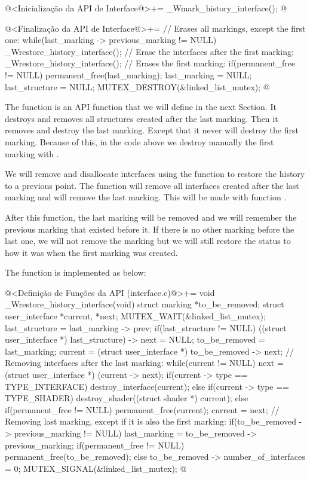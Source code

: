 \iniciocodigo
@<Inicialização da API de Interface@>+=
_Wmark_history_interface();
@
\fimcodigo

\iniciocodigo
@<Finalização da API de Interface@>+=
// Erases all markings, except the first one:
while(last_marking -> previous_marking != NULL){
  _Wrestore_history_interface();
}
// Erase the interfaces after the first marking:
_Wrestore_history_interface();
// Erases the first marking:
if(permanent_free != NULL)
  permanent_free(last_marking);
last_marking = NULL;
last_structure = NULL;
MUTEX_DESTROY(&linked_list_mutex);
@
\fimcodigo

The function  is an API
function that we will define in the next Section. It destroys and
removes all structures created after the last marking. Then it removes
and destroy the last marking. Except that it never will destroy the
first marking. Because of this, in the code above we destroy manually
the first marking with .


We will remove and disallocate interfaces using the function to
restore the history to a previous point. The function will remove all
interfaces created after the last marking and will remove the last
marking. This will be made with
function .

After this function, the last marking will be removed and we will
remember the previous marking that existed before it. If there is no
other marking before the last one, we will not remove the marking but
we will still restore the status to how it was when the first marking
was created.

The function is implemented as below:

\iniciocodigo
@<Definição de Funções da API (interface.c)@>+=
void _Wrestore_history_interface(void){
  struct marking *to_be_removed;
  struct user_interface *current, *next;
  MUTEX_WAIT(&linked_list_mutex);
  last_structure = last_marking -> prev;
  if(last_structure != NULL)
    ((struct user_interface *) last_structure) -> next = NULL;
  to_be_removed = last_marking;
  current = (struct user_interface *) to_be_removed -> next;
  // Removing interfaces after the last marking:
  while(current != NULL){
    next = (struct user_interface *) (current -> next);
    if(current -> type == TYPE_INTERFACE)
      destroy_interface(current);
    else if(current -> type == TYPE_SHADER)
      destroy_shader((struct shader *) current);
    else if(permanent_free != NULL)
      permanent_free(current);
    current = next;
  }
  // Removing last marking, except if it is also the first marking:
  if(to_be_removed -> previous_marking != NULL){
    last_marking = to_be_removed -> previous_marking;
    if(permanent_free != NULL)
      permanent_free(to_be_removed);
  }
  else
    to_be_removed -> number_of_interfaces = 0;
  MUTEX_SIGNAL(&linked_list_mutex);
}
@
\fimcodigo

